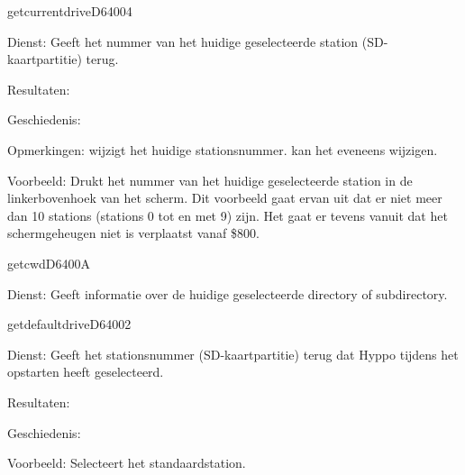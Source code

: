\newpage
\begin{hyppotrap}{getcurrentdrive}{D640}{04}

\item [Dienst:]  Geeft het nummer van het huidige geselecteerde station (SD-kaartpartitie) terug.
\item [Resultaten:]  
\item [Geschiedenis:]

\item [Opmerkingen:]   wijzigt het huidige stationsnummer.   kan het eveneens wijzigen.
\item [Voorbeeld:]  Drukt het nummer van het huidige geselecteerde station in de linkerbovenhoek van het scherm. Dit voorbeeld gaat ervan uit dat er niet meer dan 10 stations (stations 0 tot en met 9) zijn. Het gaat er tevens vanuit dat het schermgeheugen niet is verplaatst vanaf \$800.
\end{hyppotrap}


\newpage
\begin{hyppotrap}{getcwd}{D640}{0A}
\item [Dienst:]  Geeft informatie over de huidige geselecteerde directory of subdirectory.
\notimplemented
\end{hyppotrap}


\newpage
\begin{hyppotrap}{getdefaultdrive}{D640}{02}

\item [Dienst:]  Geeft het stationsnummer (SD-kaartpartitie) terug dat Hyppo tijdens het opstarten heeft geselecteerd.
\item [Resultaten:]  
\item [Geschiedenis:]
\item [Voorbeeld:]  Selecteert het standaardstation.
\end{hyppotrap}


